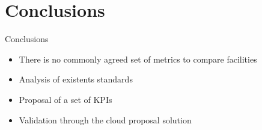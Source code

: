 
\section{Conclusions}

\begin{frame}{Conclusions}
	\begin{itemize}
		\item There is no commonly agreed set of metrics to compare facilities
	\end{itemize}

	\begin{itemize}
		\item Analysis of existents standards
	\end{itemize}
	\begin{itemize}
		\item Proposal of a set of KPIs
	\end{itemize}
	\begin{itemize}
		\item Validation through the cloud proposal solution
	\end{itemize}
\end{frame}
